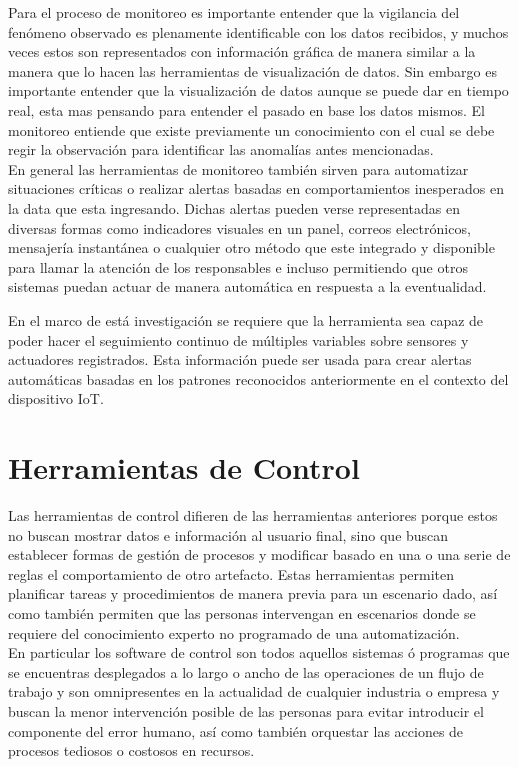 Para el proceso de monitoreo es importante entender que la vigilancia del fenómeno observado es plenamente identificable con los datos recibidos, y muchos veces estos son representados con información gráfica de manera similar a la manera que lo hacen las herramientas de visualización de datos. Sin embargo es importante entender que la visualización de datos aunque se puede dar en tiempo real, esta mas pensando para entender el pasado en base los datos mismos. El monitoreo entiende que existe previamente un conocimiento con el cual se debe regir la observación para identificar las anomalías antes mencionadas.\\

En general las herramientas de monitoreo también sirven para automatizar situaciones críticas o realizar alertas basadas en comportamientos inesperados en la data que esta ingresando. Dichas alertas pueden verse representadas en diversas formas como indicadores visuales en un panel, correos electrónicos, mensajería instantánea o cualquier otro método que este integrado y disponible para llamar la atención de los responsables e incluso permitiendo que otros sistemas puedan actuar de manera automática en respuesta a la eventualidad. 

En el marco de está investigación se requiere que la herramienta sea capaz de poder hacer el seguimiento continuo de múltiples variables sobre sensores y actuadores registrados. Esta información puede ser usada para crear alertas automáticas basadas en los patrones reconocidos anteriormente en el contexto del dispositivo IoT. 


\section{Herramientas de Control}
Las herramientas de control difieren de las herramientas anteriores porque estos no buscan mostrar datos e información al usuario final, sino que buscan establecer formas de gestión de procesos y modificar basado en una o una serie de reglas el comportamiento de otro artefacto. Estas herramientas permiten planificar tareas y procedimientos de manera previa para un escenario dado, así como también permiten que las personas intervengan en escenarios donde se requiere del conocimiento experto no programado de una automatización.\\

En particular los software de control son todos aquellos sistemas ó programas que se encuentras desplegados a lo largo o ancho de las operaciones de un flujo de trabajo y son omnipresentes en la actualidad de cualquier industria o empresa y buscan la menor intervención posible de las personas para evitar introducir el componente del error humano, así como también orquestar las acciones de procesos tediosos o costosos en recursos.\\

